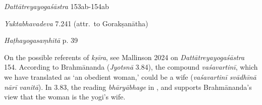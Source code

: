 \begin{ekdosis}
\begin{sources}[hp03_080]
\emph{Dattātreyayogaśāstra} 153ab-154ab
\begin{versinnote}
\end{versinnote}
\end{sources}

\begin{testimonia}[hp03_080]
\emph{Yuktabhavadeva} 7.241 (attr.~to Gorakṣanātha)
\begin{versinnote}
\end{versinnote}

\emph{Haṭhayogasaṃhitā} p. 39
\begin{versinnote}
\end{versinnote}

\end{testimonia}

\begin{philcomm}[hp03_080]
On the possible referents of \emph{kṣīra}, see Mallinson 2024 on \emph{Dattātreyayogaśāstra} 154. According to Brahmānanda (\emph{Jyotsnā} 3.84), the compound \emph{vaśavartinī}, which we have translated as `an obedient woman,' could be a wife (\emph{vaśavartinī svādhīnā nārī vanitā}). In 3.83, the reading \emph{bhāryābhage} in ,  and  supports Brahmānanda's view that the woman is the yogi's wife. 
\end{philcomm}



\end{ekdosis}
